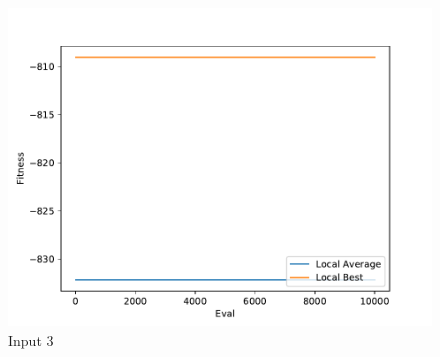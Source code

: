\documentclass{standalone}
\begin{document}
\begin{figure}[!htb]
	\caption{Input 3}
	\label{fig:graph_3041}
	\includegraphics[width=\textwidth]{../graphs/graphs/3041.pdf}
\end{figure}
\end{document}
